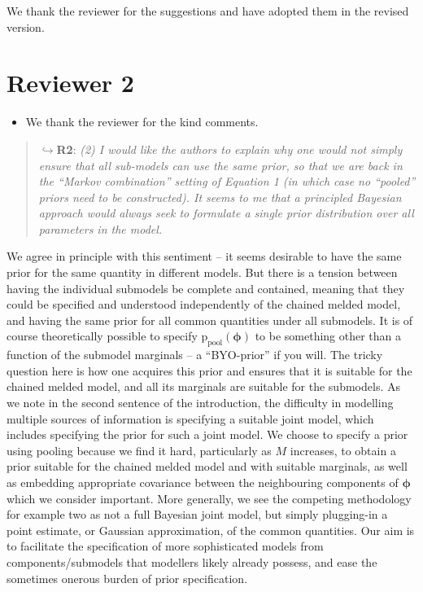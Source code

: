 \documentclass[
  10pt,
  a4paper,
]{article}
\providecommand{\tightlist}{%
  \setlength{\itemsep}{0pt}\setlength{\parskip}{0pt}}
\newcommand{\pd}{\text{p}}
\newcommand{\Nm}{M}
\begin{document}
We thank the reviewer for the suggestions and have adopted them in the
revised version.

\hypertarget{reviewer-2}{%
\section*{Reviewer 2}\label{reviewer-2}}

\begin{itemize}
\tightlist
\item
  We thank the reviewer for the kind comments.
\end{itemize}

\begin{quote}
\(\hookrightarrow\)\textbf{R2}: \emph{(2) I would like the authors to
explain why one would not simply ensure that all sub-models can use the
same prior, so that we are back in the ``Markov combination'' setting of
Equation 1 (in which case no ``pooled'' priors need to be constructed).
It seems to me that a principled Bayesian approach would always seek to
formulate a single prior distribution over all parameters in the model.}
\end{quote}

We agree in principle with this sentiment -- it seems desirable to have
the same prior for the same quantity in different models. But there is a
tension between having the individual submodels be complete and
contained, meaning that they could be specified and understood
independently of the chained melded model, and having the same prior for
all common quantities under all submodels. It is of course theoretically
possible to specify \(\pd_{\text{pool}}(\boldsymbol{\phi})\) to be
something other than a function of the submodel marginals -- a
``BYO-prior'' if you will. The tricky question here is how one acquires
this prior and ensures that it is suitable for the chained melded model,
and all its marginals are suitable for the submodels. As we note in the
second sentence of the introduction, the difficulty in modelling
multiple sources of information is specifying a suitable joint model,
which includes specifying the prior for such a joint model. We choose to
specify a prior using pooling because we find it hard, particularly as
\(\Nm\) increases, to obtain a prior suitable for the chained melded
model and with suitable marginals, as well as embedding appropriate
covariance between the neighbouring components of \(\boldsymbol{\phi}\)
which we consider important. More generally, we see the competing
methodology for example two as not a full Bayesian joint model, but
simply plugging-in a point estimate, or Gaussian approximation, of the
common quantities. Our aim is to facilitate the specification of more
sophisticated models from components/submodels that modellers likely
already possess, and ease the sometimes onerous burden of prior
specification.
\end{document}
